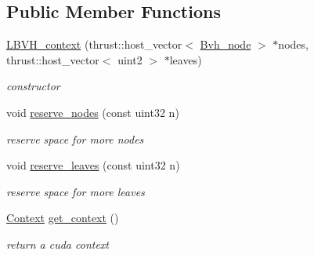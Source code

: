 \subsection*{\-Public \-Member \-Functions}
\begin{DoxyCompactItemize}
\item 
\hypertarget{structnih_1_1_l_b_v_h__context_a34282154a3fe6fd266b421f6fd555025}{
\hyperlink{structnih_1_1_l_b_v_h__context_a34282154a3fe6fd266b421f6fd555025}{\-L\-B\-V\-H\-\_\-context} (thrust\-::host\-\_\-vector$<$ \hyperlink{structnih_1_1_bvh__node}{\-Bvh\-\_\-node} $>$ $\ast$nodes, thrust\-::host\-\_\-vector$<$ uint2 $>$ $\ast$leaves)}
\label{structnih_1_1_l_b_v_h__context_a34282154a3fe6fd266b421f6fd555025}

\begin{DoxyCompactList}\small\item\em constructor \end{DoxyCompactList}\item 
\hypertarget{structnih_1_1_l_b_v_h__context_a4df05745f7ef1ca81f2cb469578dd9ce}{
void \hyperlink{structnih_1_1_l_b_v_h__context_a4df05745f7ef1ca81f2cb469578dd9ce}{reserve\-\_\-nodes} (const uint32 n)}
\label{structnih_1_1_l_b_v_h__context_a4df05745f7ef1ca81f2cb469578dd9ce}

\begin{DoxyCompactList}\small\item\em reserve space for more nodes \end{DoxyCompactList}\item 
\hypertarget{structnih_1_1_l_b_v_h__context_ac37452c7c9b371c933deea085ca4e5fe}{
void \hyperlink{structnih_1_1_l_b_v_h__context_ac37452c7c9b371c933deea085ca4e5fe}{reserve\-\_\-leaves} (const uint32 n)}
\label{structnih_1_1_l_b_v_h__context_ac37452c7c9b371c933deea085ca4e5fe}

\begin{DoxyCompactList}\small\item\em reserve space for more leaves \end{DoxyCompactList}\item 
\hypertarget{structnih_1_1_l_b_v_h__context_ae1e39948afe9d5a1bab0432d5c06193e}{
\hyperlink{structnih_1_1_l_b_v_h__context_1_1_context}{\-Context} \hyperlink{structnih_1_1_l_b_v_h__context_ae1e39948afe9d5a1bab0432d5c06193e}{get\-\_\-context} ()}
\label{structnih_1_1_l_b_v_h__context_ae1e39948afe9d5a1bab0432d5c06193e}

\begin{DoxyCompactList}\small\item\em return a cuda context \end{DoxyCompactList}\end{DoxyCompactItemize}
